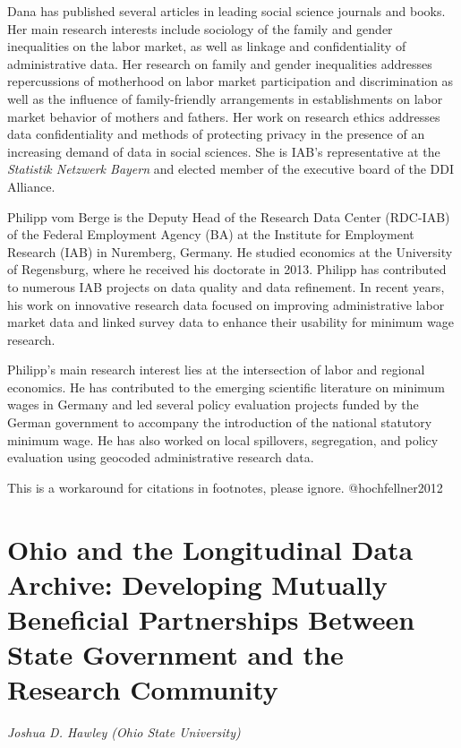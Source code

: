 \documentclass[
]{WileySix}
\begin{document}
Dana has published several articles in leading social science journals and books. Her main research interests include sociology of the family and gender inequalities on the labor market, as well as linkage and confidentiality of administrative data. Her research on family and gender inequalities addresses repercussions of motherhood on labor market participation and discrimination as well as the influence of family-friendly arrangements in establishments on labor market behavior of mothers and fathers. Her work on research ethics addresses data confidentiality and methods of protecting privacy in the presence of an increasing demand of data in social sciences. She is IAB's representative at the \emph{Statistik Netzwerk Bayern} and elected member of the executive board of the DDI Alliance.

Philipp vom Berge is the Deputy Head of the Research Data Center (RDC-IAB) of the Federal Employment Agency (BA) at the Institute for Employment Research (IAB) in Nuremberg, Germany. He studied economics at the University of Regensburg, where he received his doctorate in 2013. Philipp has contributed to numerous IAB projects on data quality and data refinement. In recent years, his work on innovative research data focused on improving administrative labor market data and linked survey data to enhance their usability for minimum wage research.

Philipp's main research interest lies at the intersection of labor and regional economics. He has contributed to the emerging scientific literature on minimum wages in Germany and led several policy evaluation projects funded by the German government to accompany the introduction of the national statutory minimum wage. He has also worked on local spillovers, segregation, and policy evaluation using geocoded administrative research data.

\begin{invisible}
This is a workaround for citations in footnotes, please ignore.
@hochfellner2012
\end{invisible}

\hypertarget{olda}{%
\section{Ohio and the Longitudinal Data Archive: Developing Mutually Beneficial Partnerships Between State Government and the Research Community}\label{olda}}

\emph{Joshua D. Hawley (Ohio State University)}
\end{document}
